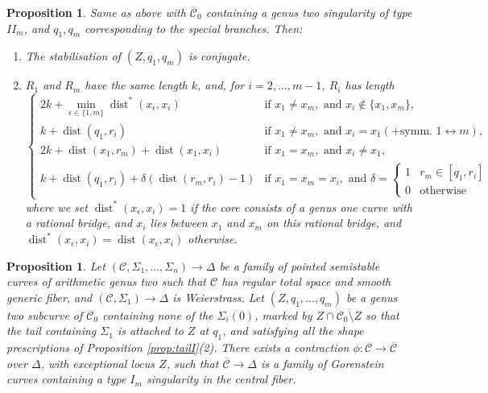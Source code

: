 \documentclass[11pt]{amsart}
\renewcommand{\to}{\rightarrow}
\newcommand{\dvr}{\Delta}
\newcommand{\dist}{\operatorname{dist}}
\theoremstyle{plain}
\newtheorem{prop}[thm]{Proposition}
\theoremstyle{definition}
\begin{document}
\begin{prop}\label{prop:tailII}
 Same as above with $\overline{\mathcal C}_0$ containing a genus two singularity of type $I\!I_m$, and $q_1,q_m$ corresponding to the special branches. Then:
 \begin{enumerate}[leftmargin=.6cm]
  \item The stabilisation of $(Z,q_1,q_m)$ is conjugate.
  \item $R_1$ and $R_m$ have the same length $k$, and, for $i=2,\ldots,m-1$, $R_i$ has length 
  \begin{equation*}
  \begin{cases}
   2k+\min_{\epsilon\in\{1,m\}}\dist^*(x_\epsilon,x_i) & \text{if } x_1\neq x_m, \text{ and } x_i\notin\{x_1,x_m\},\\
   k+\dist(q_1, r_i)  & \text{if } x_1\neq x_m, \text{ and } x_i=x_1 (\text{+symm. } 1\leftrightarrow m), \\
   2k+\dist(x_1,r_m)+\dist(x_1,x_i) & \text{if } x_1= x_m, \text{ and } x_i\neq x_1, \\
   k+\dist(q_1, r_i)+\delta(\dist(r_m,r_i)-1)& \text{if } x_1= x_m= x_i, \text{ and } \delta=\begin{cases} 1 & r_m\in[q_1,r_i] \\ 0 & \text{otherwise} \end{cases}
  \end{cases} 
  \end{equation*}
 where we set $\dist^*(x_\epsilon,x_i)=1$ if the core consists of a genus one curve with a rational bridge, and $x_i$ lies between $x_1$ and $x_m$ on this rational bridge, and $\dist^*(x_\epsilon,x_i)=\dist(x_\epsilon,x_i)$ otherwise.
 \end{enumerate}
\end{prop}

\begin{prop}\label{prop:contractionI}
 Let $(\mathcal C,\Sigma_1,\ldots,\Sigma_n)\to\dvr$ be a family of pointed semistable curves of arithmetic genus two such that $\mathcal C$ has regular total space and smooth generic fiber, and $(\mathcal C,\Sigma_1)\to \Delta$ is Weierstrass. Let $(Z,q_1,\ldots,q_m)$ be a genus two subcurve of $\mathcal C_0$ containing none of the $\Sigma_i(0)$, marked by $Z\cap \overline{\mathcal C_0\setminus Z}$ so that the tail containing $\Sigma_1$ is attached to $Z$ at $q_1$, and satisfying all the shape prescriptions of Proposition \ref{prop:tailI}(2). There exists a contraction $\phi\colon\mathcal C\to\overline{\mathcal C}$ over $\dvr$, with exceptional locus $Z$, such that $\overline{\mathcal C}\to\dvr$ is a family of Gorenstein curves containing a type $I_m$ singularity in the central fiber.
\end{prop}
\end{document}
